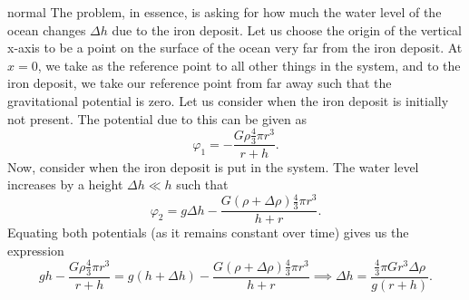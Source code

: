 \begin{solution}{normal}
The problem, in essence, is asking for how much the water level of the ocean changes $\Delta h$ due to the iron deposit. Let us choose the origin of the vertical x-axis to be a point on the surface of the ocean very far from the iron deposit. At $x = 0$, we take as the reference point to all other things in the system, and to the iron deposit, we take our reference point from far away such that the gravitational potential is zero. Let us consider when the iron deposit is initially not present. The potential due to this can be given as 
\[\varphi_1 = - \frac{G\rho \frac{4}{3}\pi r^3}{r + h}.\]
Now, consider when the iron deposit is put in the system. The water level increases by a height $\Delta h \ll h$ such that 
\[\varphi_2 = g\Delta h - \frac{G (\rho + \Delta \rho)\frac{4}{3}\pi r^3}{h + r}.\]
Equating both potentials (as it remains constant over time) gives us the expression 
\[gh - \frac{G\rho \frac{4}{3}\pi r^3}{r + h} = g(h + \Delta h) - \frac{G (\rho + \Delta \rho)\frac{4}{3}\pi r^3}{h + r}\implies \Delta h = \frac{\frac{4}{3}\pi G r^3\Delta \rho}{g(r + h)}.\]
\end{solution}
